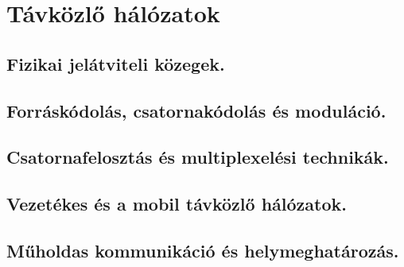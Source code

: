 \section{Távközlő hálózatok}
\subsection{Fizikai jelátviteli közegek.}

\subsection{Forráskódolás, csatornakódolás és moduláció.}

\subsection{Csatornafelosztás és multiplexelési technikák.}

\subsection{Vezetékes és a mobil távközlő hálózatok.}

\subsection{Műholdas kommunikáció és helymeghatározás.}

